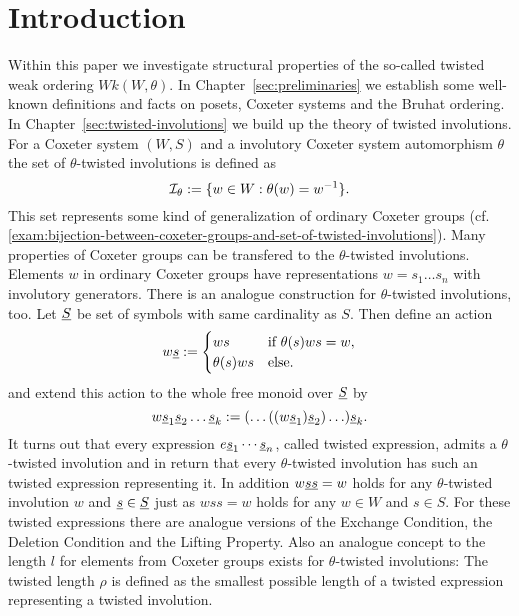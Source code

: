 \chapter*{Introduction}
\label{sec:introduction}

Within this paper we investigate structural properties of the so-called twisted weak ordering $Wk(W,\theta)$. In Chapter~\ref{sec:preliminaries} we establish some well-known definitions and facts on posets, Coxeter systems and the Bruhat ordering. In Chapter~\ref{sec:twisted-involutions} we build up the theory of twisted involutions. For a Coxeter system $(W,S)$ and a involutory Coxeter system automorphism $\theta$ the set of $\theta$-twisted involutions is defined as
$$ \mathcal{I}_{\theta} := \{ w \in W : \theta(w) = w^{-1} \}. $$
This set represents some kind of generalization of ordinary Coxeter groups (cf. \ref{exam:bijection-between-coxeter-groups-and-set-of-twisted-involutions}). Many properties of Coxeter groups can be transfered to the $\theta$-twisted involutions. Elements $w$ in ordinary Coxeter groups have representations $w = s_1 \ldots s_n$ with involutory generators. There is an analogue construction for $\theta$-twisted involutions, too. Let $\underline{S}$ be set of symbols with same cardinality as $S$. Then define an action
$$ w \underline{s} := \begin{cases}
	ws & \textrm{if } \theta(s)ws = w, \\
	\theta(s)ws & \textrm{else}. \\
\end{cases} $$
and extend this action to the whole free monoid over $\underline{S}$ by
$$w \underline{s}_1 \underline{s}_2 \ldots \underline{s}_k := (\ldots ((w \underline{s}_1) \underline{s}_2) \ldots) \underline{s}_k. $$
It turns out that every expression $e \underline{s}_1 \cdots \underline{s}_n$, called twisted expression, admits a $\theta$-twisted involution and in return that every $\theta$-twisted involution has such an twisted expression representing it. In addition $w \underline{s} \underline{s} = w$ holds for any $\theta$-twisted involution $w$ and $\underline{s} \in \underline{S}$ just as $w s s = w$ holds for any $w \in W$ and $s \in S$. For these twisted expressions there are analogue versions of the Exchange Condition, the Deletion Condition and the Lifting Property. Also an analogue concept to the length $l$ for elements from Coxeter groups exists for $\theta$-twisted involutions: The twisted length $\rho$ is defined as the smallest possible length of a twisted expression representing a twisted involution.

